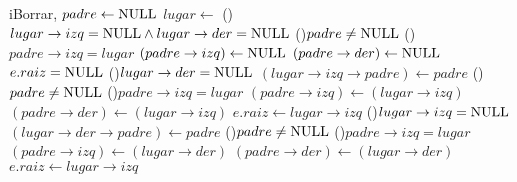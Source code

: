 \begin{Algoritmos}
  \begin{algoritmo}{iBorrar}{, }{}
     $padre \gets \textrm{NULL}$ 
     $lugar \gets$  
    \uIf(){$lugar \to izq = \textrm{NULL} \land lugar \to der = \textrm{NULL}$}{
      \eIf(){$padre \neq \textrm{NULL}$}{
        \eIf(){$padre \to izq = lugar$}{
          $(padre \to izq) \gets \textrm{NULL}$ 
        }{
          $(padre \to der) \gets \textrm{NULL}$ 
        }
         
      }{
        $e.raiz = \textrm{NULL}$ 
      }
    }\uElseIf(){$lugar \to der = \textrm{NULL}$}{
      $(lugar \to izq \to padre) \gets padre$ 
      \eIf(){$padre \neq \textrm{NULL}$}{
        \eIf(){$padre \to izq = lugar$}{
          $(padre \to izq) \gets (lugar \to izq)$ 
        }{
          $(padre \to der) \gets (lugar \to izq)$ 
        }
         
      }{
        $e.raiz \gets lugar \to izq$ 
      }
    }\uElseIf(){$lugar \to izq = \textrm{NULL}$}{
      $(lugar \to der \to padre) \gets padre$ 
      \eIf(){$padre \neq \textrm{NULL}$}{
        \eIf(){$padre \to izq = lugar$}{
          $(padre \to izq) \gets (lugar \to der)$ 
        }{
          $(padre \to der) \gets (lugar \to der)$ 
        }
         
      }{
        $e.raiz \gets lugar \to izq$ 
      }
    }
  \end{algoritmo}


\end{Algoritmos}

